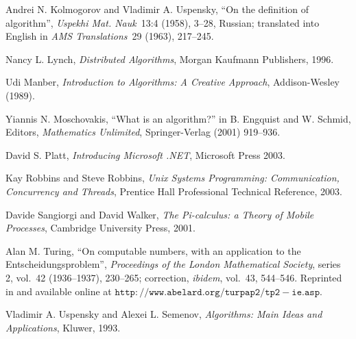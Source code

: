 \documentclass{LMCS}
\theoremstyle{definition}
\newcommand{\ttt}[1]{\ensuremath{\mathtt {#1}}}
\begin{document}
\begin{thebibliography}{99}
 Andrei N. Kolmogorov and Vladimir A. Uspensky, ``On the
 definition of algorithm'', {\it Uspekhi Mat. Nauk}~13:4 (1958),
 3--28,
 Russian; translated into English in {\it AMS Translations}~29 (1963),
 217--245.

Nancy L. Lynch, \emph{Distributed Algorithms}, Morgan Kaufmann
Publishers, 1996.


Udi Manber, \emph{Introduction to Algorithms: A Creative Approach},
Addison-Wesley (1989).

Yiannis N. Moschovakis, ``What is an algorithm?''
in B. Engquist and W. Schmid, Editors, {\it Mathematics Unlimited},
Springer-Verlag (2001) 919--936.

David S. Platt, \emph{Introducing Microsoft .NET}, Microsoft Press
2003.

 Kay Robbins and Steve Robbins, \emph{Unix Systems
  Programming: Communication, Concurrency and Threads}, Prentice Hall
  Professional Technical Reference, 2003.

 Davide Sangiorgi and David Walker, \emph{The Pi-calculus: a
  Theory of Mobile Processes}, Cambridge University Press, 2001.

 Alan M. Turing, ``On computable numbers, with an
application to the Entscheidungsproblem'', {\it Proceedings of the
London Mathematical Society}, series 2, vol.\ 42 (1936--1937),
230--265; correction, {\it ibidem}, vol.\ 43, 544--546.  Reprinted in
\cite[155--222]{Davis65} and available online at
\ttt{http://www.abelard.org/turpap2/tp2-ie.asp}.

 Vladimir A. Uspensky and Alexei L. Semenov,
  \emph{Algorithms: Main Ideas and Applications}, Kluwer, 1993.

\end{thebibliography}
\end{document}
